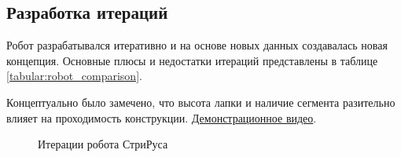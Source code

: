 \subsection{Разработка итераций}
Робот разрабатывался итеративно и на основе новых данных создавалась новая концепция. Основные плюсы и недостатки итераций представлены в таблице \ref{tabular:robot_comparison}.

Концептуально было замечено, что высота лапки и наличие сегмента разительно влияет на проходимость конструкции. \href{https://youtu.be/EQ6oGZVDpoc}{Демонстрационное видео}.

\begin{figure}[H]
    \caption[Этот текст попадает в названия рисунков в списке рисунков]{Итерации робота СтриРуса}\label{fig:striruses}
  \end{figure}
  \vspace{-0.5cm}

